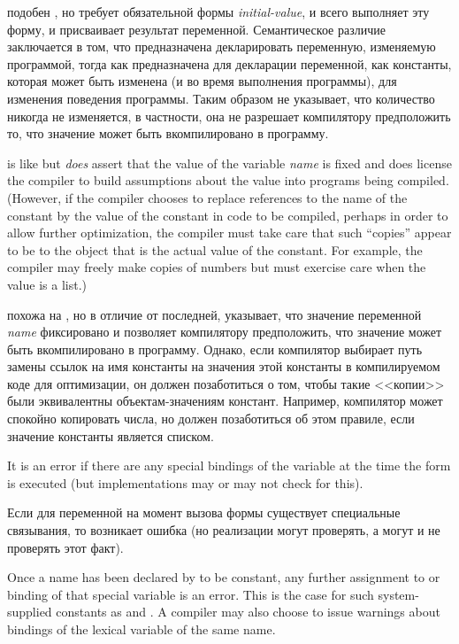 \begin{defmac}
 подобен , но  требует
обязательной формы \textit{initial-value}, и всего выполняет эту форму, и
присваивает результат переменной. Семантическое различие заключается в том, что
 предназначена декларировать переменную, изменяемую программой,
тогда как  предназначена для декларации переменной, как
константы, которая может быть изменена (и во время выполнения программы), для
изменения поведения программы. Таким образом  не указывает,
что количество никогда не изменяется, в частности, она не разрешает 
компилятору предположить то, что значение может быть вкомпилировано в
программу.

 is like  but \textit{does} assert that
the value of the variable \textit{name} is fixed and does license
the compiler to build assumptions about the value into programs being
compiled.  (However, if the compiler chooses to replace references
to the name of the constant by the value of the constant in code
to be compiled, perhaps in order to allow further optimization,
the compiler must take care that such ``copies'' appear to be 
to the object that is the actual value of the constant.  For example,
the compiler may freely make copies of numbers but must exercise
care when the value is a list.)

 похожа на , но в отличие от последней,
указывает, что значение переменной \textit{name} фиксировано и позволяет
компилятору предположить, что значение может быть вкомпилировано в
программу. Однако, если компилятор выбирает путь замены ссылок на имя константы
на значения этой константы в компилируемом коде для оптимизации, он должен
позаботиться о том, чтобы такие <<копии>> были эквивалентны 
объектам-значениям констант. Например, компилятор может спокойно копировать
числа, но должен позаботиться об этом правиле, если значение константы
является списком.

It is an error if there are any special bindings
of the variable at the time the  form
is executed (but implementations may or may not check for this).

Если для переменной на момент вызова формы  существует
специальные связывания, то возникает ошибка (но реализации могут проверять, а
могут и не проверять этот факт).

Once a name has been declared by  to be constant,
any further assignment to or binding of that special variable is an error.
This is the case for such system-supplied constants as  and
.
A compiler may also choose to issue warnings about bindings of
the lexical variable of the same name.


\end{defmac}
